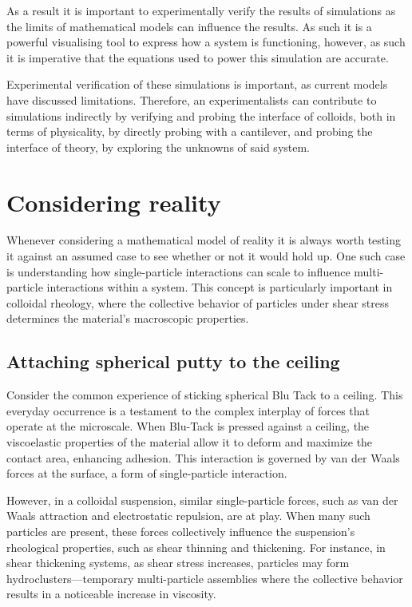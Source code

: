 As a result it is important to experimentally verify the results of simulations as the limits of mathematical models can influence the results. As such it is a powerful visualising tool to express how a system is functioning, however, as such it is imperative that the equations used to power this simulation are accurate. 

Experimental verification of these simulations is important, as current models have discussed limitations. Therefore, an experimentalists can contribute to simulations indirectly by verifying and probing the interface of colloids, both in terms of physicality, by directly probing with a cantilever, and probing the interface of theory, by exploring the unknowns of said system. \cite{SmartMats, Rheo2}


\section{Considering reality}

Whenever considering a mathematical model of reality it is always worth testing it against an assumed case to see whether or not it would hold up. One such case is understanding how single-particle interactions can scale to influence multi-particle interactions within a system. This concept is particularly important in colloidal rheology, where the collective behavior of particles under shear stress determines the material’s macroscopic properties.

\subsection{Attaching spherical putty to the ceiling}

Consider the common experience of sticking spherical Blu Tack to a ceiling. This everyday occurrence is a testament to the complex interplay of forces that operate at the microscale. When Blu-Tack is pressed against a ceiling, the viscoelastic properties of the material allow it to deform and maximize the contact area, enhancing adhesion. This interaction is governed by van der Waals forces at the surface, a form of single-particle interaction.

However, in a colloidal suspension, similar single-particle forces, such as van der Waals attraction and electrostatic repulsion, are at play. When many such particles are present, these forces collectively influence the suspension's rheological properties, such as shear thinning and thickening. For instance, in shear thickening systems, as shear stress increases, particles may form hydroclusters—temporary multi-particle assemblies where the collective behavior results in a noticeable increase in viscosity.


